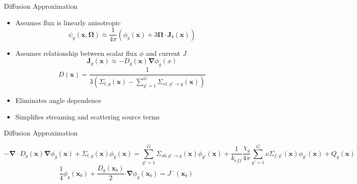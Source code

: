
\begin{frame}[t]{Diffusion Approximation}
    
    \begin{itemize}
      \item Assumes flux is linearly anisotropic
      \begin{equation*}
       \psi_g\left(\bm x,\bm \Omega\right) \approx 
       \frac{1}{4\pi}\left(\phi_g\left(\bm x\right) + 3\bm \Omega \cdot \bm 
       J_b\left(\bm x\right)\right)
      \end{equation*}
      \item Assumes relationship between scalar flux $\phi$ and current $J$
      \begin{equation*}
      \bm J_g\left(\bm x\right) \approx -D_g\left(\bm x\right) \bm \nabla 
      \phi_g\left(x\right)
      \end{equation*}
      \begin{equation*}
      D\left(\bm x\right)  = \frac{1}{3\left(\Sigma_{t,g}\left(\bm 
      x\right)-\sum_{g'=1}^G \Sigma_{s1,g'\rightarrow g}\left(\bm 
      x\right)\right)}
      \end{equation*}
      \item Eliminates angle dependence
      \item Simplifies streaming and scattering source terms
    \end{itemize}
  
\end{frame}


\begin{frame}[t]{Diffusion Approximation}
  
    \begin{dmath*}\label{e:DiffusionEquation}
        {-\bm\nabla \cdot D_g\left(\bm x\right) \bm \nabla\phi_g\left(\bm 
        x\right) + \Sigma_{t,g}\left(\bm x\right)\phi_g\left(\bm x\right) = 
        \sum_{g'=1}^G \Sigma_{s0,g'\rightarrow g}\left(\bm 
        x\right)\phi_{g'}\left(\bm x\right)} + 
        {\frac{1}{k_{eff}}\frac{\chi_g}{4\pi} \sum_{g'=1}^G 
        \nu\Sigma_{f,g'}\left(\bm x\right)\phi_{g'}\left(\bm x\right)} + 
        Q_g\left(\bm x\right)
    \end{dmath*}
    \begin{equation*}\label{e:DiffusionEquationBC}
    \frac{1}{4} \phi_g\left(\bm x_b\right) + \frac{D_g\left(\bm x_b\right)}{2} 
    \bm \cdot \bm \nabla \phi_g\left(\bm x_b\right) = J^-\left(\bm x_b\right)
    \end{equation*}
    
\end{frame}

